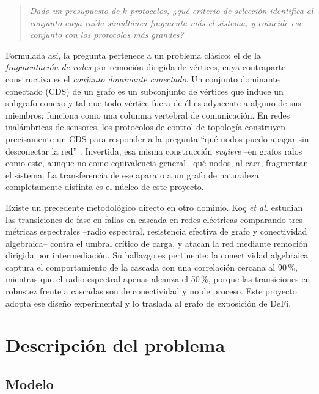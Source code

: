 \documentclass[journal]{IEEEtran}
\begin{document}
\begin{quote}
\emph{Dado un presupuesto de $k$ protocolos, ¿qué criterio de selección
identifica al conjunto cuya caída simultánea fragmenta más el sistema, y
coincide ese conjunto con los protocolos más grandes?}
\end{quote}

Formulada así, la pregunta pertenece a un problema clásico: el de la
\emph{fragmentación de redes} por remoción dirigida de vértices, cuya
contraparte constructiva es el \emph{conjunto dominante conectado}. Un conjunto dominante conectado (CDS) de un grafo es un subconjunto
de vértices que induce un subgrafo conexo y tal que todo vértice fuera de él es
adyacente a alguno de sus miembros; funciona como una columna vertebral de
comunicación. En redes inalámbricas de sensores, los protocolos de control de
topología construyen precisamente un CDS para responder a la pregunta ``qué nodos
puedo apagar sin desconectar la red''
\cite{wightman2010topology,wightman2008a3}. Invertida, esa misma construcción
\emph{sugiere} --en grafos ralos como este, aunque no como equivalencia
general-- qué nodos, al caer, fragmentan el sistema. La transferencia de ese
aparato a un grafo de naturaleza completamente distinta es el núcleo de este
proyecto.

Existe un precedente metodológico directo en otro dominio. Koç \emph{et al.}
\cite{koc2014topological} estudian las transiciones de fase en fallas en cascada
en redes eléctricas comparando tres métricas espectrales --radio espectral,
resistencia efectiva de grafo y conectividad algebraica-- contra el umbral crítico
de carga, y atacan la red mediante remoción dirigida por intermediación. Su
hallazgo es pertinente: la conectividad algebraica \cite{fiedler1973algebraic}
captura el comportamiento de la cascada con una correlación cercana al 90\,\%,
mientras que el radio espectral apenas alcanza el 50\,\%, porque las transiciones
en robustez frente a cascadas son de conectividad y no de proceso. Este proyecto
adopta ese diseño experimental y lo traslada al grafo de exposición de DeFi.

\section{Descripción del problema}

\subsection{Modelo}
\end{document}
